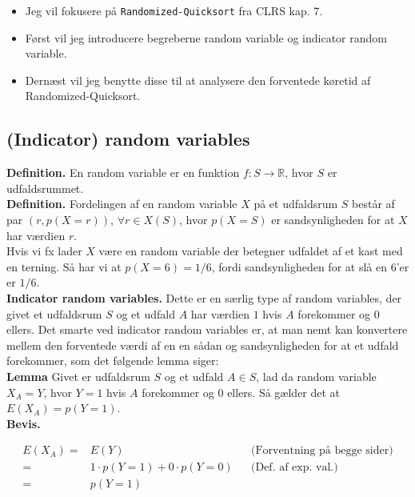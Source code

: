 \documentclass[12pt]{article}
\newcommand{\R}{\mathbb{R}}
\begin{document}
\begin{itemize}
    \item Jeg vil fokusere på \texttt{Randomized-Quicksort} fra CLRS kap. 7. 
    \item Først vil jeg introducere begreberne random variable og indicator random variable.
    \item Dernæst vil jeg benytte disse til at analysere den forventede køretid af Randomized-Quicksort.
\end{itemize}

\subsection*{(Indicator) random variables}

\textbf{Definition.} En random variable er en funktion $f: S \rightarrow \R$, hvor $S$ er udfaldsrummet. \\

\textbf{Definition.} Fordelingen af en random variable $X$ på et udfaldsrum $S$ består af par $(r, p(X=r))$, $\forall r \in X(S)$, hvor $p(X=S)$ er sandsynligheden for at $X$ har værdien $r$. \\

Hvis vi fx lader $X$ være en random variable der betegner udfaldet af et kast med en terning. Så har vi at $p(X=6)=1/6$, fordi sandsynligheden for at slå en 6'er er $1/6$. \\

\textbf{Indicator random variables.} Dette er en særlig type af random variables, der givet et udfaldsrum $S$ og et udfald $A$ har værdien $1$ hvis $A$ forekommer og $0$ ellers. Det smarte ved indicator random variables er, at man nemt kan konvertere mellem den forventede værdi af en en sådan og sandsynligheden for at et udfald forekommer, som det følgende lemma siger: \\

\textbf{Lemma} Givet er udfaldsrum $S$ og et udfald $A \in S$, lad da random variable $X_A = Y$, hvor $Y=1$ hvis $A$ forekommer og $0$ ellers. Så gælder det at $E(X_A)=p(Y=1)$. \\

\textbf{Bevis.} 

\begin{align*}
    E(X_A) =& E(Y) && \text{(Forventning på begge sider)} \\
    =& 1 \cdot p(Y=1) + 0 \cdot p(Y=0) && \text{(Def. af exp. val.)} \\
    =& p(Y=1)
\end{align*}
\end{document}
